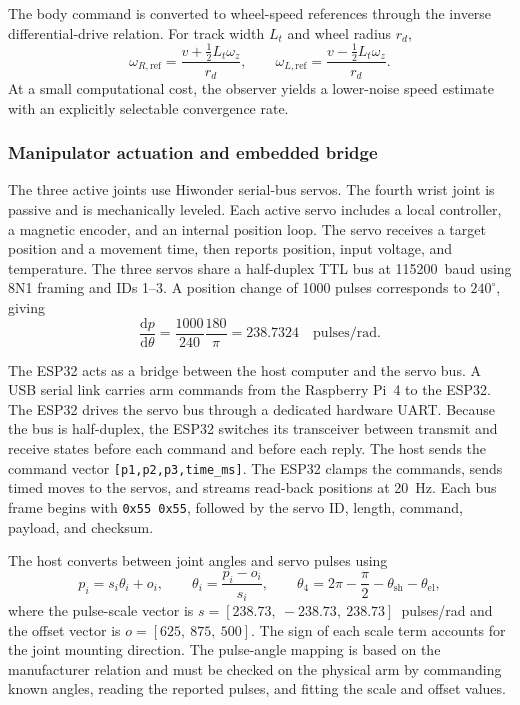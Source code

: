 The body command is converted to wheel-speed references through the inverse differential-drive relation. For track width $L_t$ and wheel radius $r_d$,
\[
\omega_{R,\mathrm{ref}}=
\frac{v+\tfrac{1}{2}L_t\omega_z}{r_d},
\qquad
\omega_{L,\mathrm{ref}}=
\frac{v-\tfrac{1}{2}L_t\omega_z}{r_d}.
\]
At a small computational cost, the observer yields a lower-noise speed estimate with an explicitly selectable convergence rate.

\subsubsection{Manipulator actuation and embedded bridge}
\label{sec:electrical_arm}

The three active joints use Hiwonder serial-bus servos. The fourth wrist joint is passive and is mechanically leveled. Each active servo includes a local controller, a magnetic encoder, and an internal position loop. The servo receives a target position and a movement time, then reports position, input voltage, and temperature. The three servos share a half-duplex TTL bus at 115200~baud using 8N1 framing and IDs 1--3. A position change of 1000 pulses corresponds to $240^\circ$, giving
\[
\frac{\mathrm{d}p}{\mathrm{d}\theta}
=
\frac{1000}{240}\frac{180}{\pi}
=
238.7324
\quad \text{pulses/rad}.
\]

The ESP32 acts as a bridge between the host computer and the servo bus. A USB serial link carries arm commands from the Raspberry Pi~4 to the ESP32. The ESP32 drives the servo bus through a dedicated hardware UART. Because the bus is half-duplex, the ESP32 switches its transceiver between transmit and receive states before each command and before each reply. The host sends the command vector \texttt{[p1,p2,p3,time\_ms]}. The ESP32 clamps the commands, sends timed moves to the servos, and streams read-back positions at 20~Hz. Each bus frame begins with \texttt{0x55 0x55}, followed by the servo ID, length, command, payload, and checksum.

The host converts between joint angles and servo pulses using
\begin{equation}
\label{eq:elec_joint_map}
p_i=s_i\theta_i+o_i,
\qquad
\theta_i=\frac{p_i-o_i}{s_i},
\qquad
\theta_4=2\pi-\frac{\pi}{2}-\theta_{\mathrm{sh}}-\theta_{\mathrm{el}},
\end{equation}
where the pulse-scale vector is
$s=[238.73,\ {-}238.73,\ 238.73]$~pulses/rad and the offset vector is
$o=[625,\ 875,\ 500]$. The sign of each scale term accounts for the joint mounting direction. The pulse-angle mapping is based on the manufacturer relation and must be checked on the physical arm by commanding known angles, reading the reported pulses, and fitting the scale and offset values.

